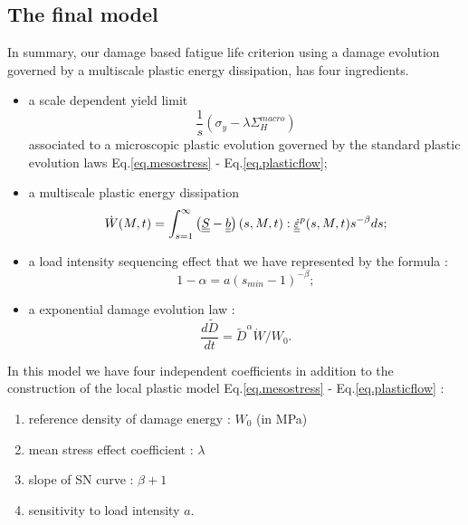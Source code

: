 \newpage
\subsection{The final model}
In summary, our damage based fatigue life criterion using a damage evolution governed by a multiscale plastic energy dissipation, has four ingredients.
\begin{itemize}
\item  a scale dependent yield limit $$\frac{1}{s} (\sigma_y- \lambda \Sigma_H^{macro})$$ associated to a microscopic plastic evolution governed by the standard plastic evolution laws Eq.\eqref{eq.mesostress} - Eq.\eqref{eq.plasticflow};

\vspace{6pt}	

\item a multiscale plastic energy dissipation
\begin{equation}
\dot{W}(M,t)=\int_{s=1}^{\infty}\left(\uline{\uline{S}}-\uline{\uline{b}} \right) (s,M,t):\uline{\uline{\dot{\varepsilon}}}^p(s,M,t) s^{-\beta}ds;
\label{eq.final2}
\end{equation}

\vspace{6pt}	

\item a load intensity sequencing effect that we have represented by the formula : 
\begin{equation}
1 - \alpha = a (s_{min}-1)^{- \beta};
\label{eq.final3}
\end{equation}

\vspace{6pt}	

\item a exponential damage evolution law : 
\begin{equation}
\dfrac{d\tilde{D}}{dt} ={\tilde{D}}^\alpha \dot{W}/W_0.
\label{eq.final4}
\end{equation}
\end{itemize}

In this model we have four independent coefficients in addition to the construction of the local plastic model Eq.\eqref{eq.mesostress} - Eq.\eqref{eq.plasticflow} :

\begin{enumerate}
\item reference density of damage energy : $W_0$ (in MPa)

\item mean stress effect coefficient : $\lambda$

\item slope of SN curve : $\beta+1$

\item sensitivity to load intensity $a$. 
\end{enumerate}

